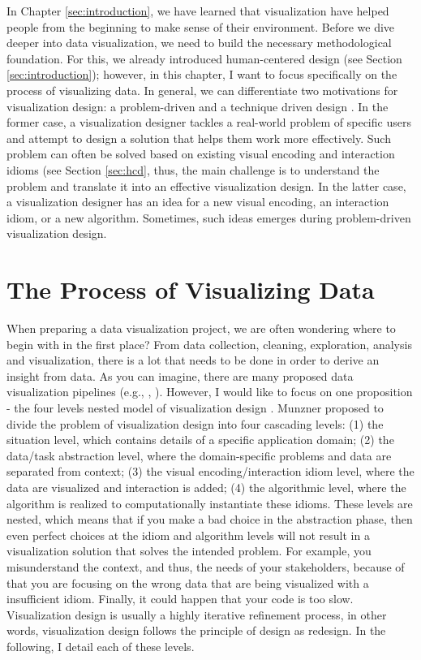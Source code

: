 \documentclass[
]{book}
\begin{document}
In Chapter \ref{sec:introduction}, we have learned that visualization have helped people from the beginning to make sense of their environment. Before we dive deeper into data visualization, we need to build the necessary methodological foundation. For this, we already introduced human-centered design (see Section \ref{sec:introduction}); however, in this chapter, I want to focus specifically on the process of visualizing data. In general, we can differentiate two motivations for visualization design: a problem-driven and a technique driven design \citep{munzner2014visualization}. In the former case, a visualization designer tackles a real-world problem of specific users and attempt to design a solution that helps them work more effectively. Such problem can often be solved based on existing visual encoding and interaction idioms (see Section \ref{sec:hcd}, thus, the main challenge is to understand the problem and translate it into an effective visualization design. In the latter case, a visualization designer has an idea for a new visual encoding, an interaction idiom, or a new algorithm. Sometimes, such ideas emerges during problem-driven visualization design.

\hypertarget{the-process-of-visualizing-data}{%
\section{The Process of Visualizing Data}\label{the-process-of-visualizing-data}}

When preparing a data visualization project, we are often wondering where to begin with in the first place? From data collection, cleaning, exploration, analysis and visualization, there is a lot that needs to be done in order to derive an insight from data. As you can imagine, there are many proposed data visualization pipelines (e.g., \citep{fry2008visualizing}, \citep{kirk2019data}). However, I would like to focus on one proposition - the four levels nested model of visualization design \citep{munzner2014visualization}. Munzner proposed to divide the problem of visualization design into four cascading levels: (1) the situation level, which contains details of a specific application domain; (2) the data/task abstraction level, where the domain-specific problems and data are separated from context; (3) the visual encoding/interaction idiom level, where the data are visualized and interaction is added; (4) the algorithmic level, where the algorithm is realized to computationally instantiate these idioms. These levels are nested, which means that if you make a bad choice in the abstraction phase, then even perfect choices at the idiom and algorithm levels will not result in a visualization solution that solves the intended problem. For example, you misunderstand the context, and thus, the needs of your stakeholders, because of that you are focusing on the wrong data that are being visualized with a insufficient idiom. Finally, it could happen that your code is too slow. Visualization design is usually a highly iterative refinement process, in other words, visualization design follows the principle of design as redesign. In the following, I detail each of these levels.
\end{document}

